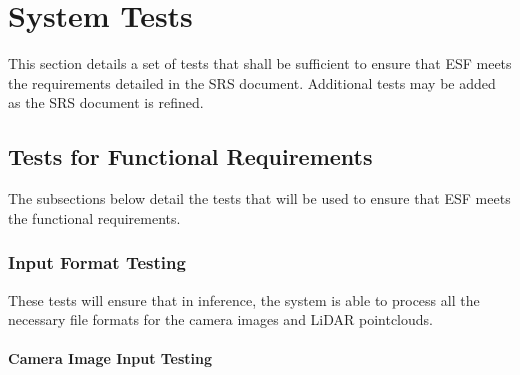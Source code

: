 \documentclass[12pt, titlepage]{article}
\newcommand{\ProjectName}{ESF }
\begin{document}
\section{System Tests} \label{System_Tests}

This section details a set of tests that shall be sufficient to ensure that \ProjectName{}meets the requirements detailed in the SRS document.
Additional tests may be added as the SRS document is refined.

\subsection{Tests for Functional Requirements}
The subsections below detail the tests that will be used to ensure that \ProjectName{}meets the functional requirements.

\subsubsection{Input Format Testing} \label{Input Format Testing}

These tests will ensure that in inference, the system is able to process all the necessary
file formats for the camera images and LiDAR pointclouds.
		
\paragraph{Camera Image Input Testing}
\end{document}
